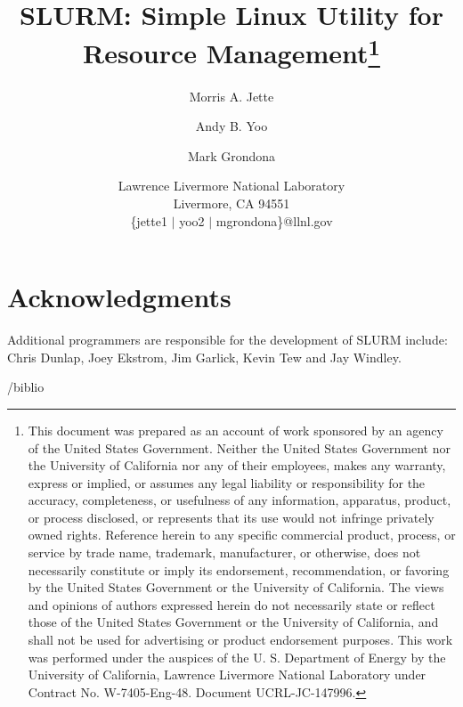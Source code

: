 \documentclass[11pt]{article}
\title{SLURM: Simple Linux Utility for Resource Management\thanks{
This document was prepared as an account of work sponsored by an
agency of the United States Government.  Neither the United States
Government nor the University of California nor any of their
employees, makes any warranty, express or implied, or assumes any
legal liability or responsibility for the accuracy, completeness, or
usefulness of any information, apparatus, product, or process
disclosed, or represents that its use would not infringe privately
owned rights. Reference herein to any specific commercial product,
process, or service by trade name, trademark, manufacturer, or
otherwise, does not necessarily constitute or imply its endorsement,
recommendation, or favoring by the United States Government or the
University of California.  The views and opinions of authors expressed
herein do not necessarily state or reflect those of the United States
Government or the University of California, and shall not be used for
advertising or product endorsement purposes.
This work was performed under the auspices of the U. S. Department of
Energy by the University of California, Lawrence Livermore National
Laboratory under Contract No. W-7405-Eng-48. Document UCRL-JC-147996.}}
\author{Morris A. Jette \and Andy B. Yoo \and Mark Grondona}
\date{Lawrence Livermore National Laboratory\\
Livermore, CA 94551\\
\{jette1 $\mid$ yoo2 $\mid$ mgrondona\}@llnl.gov}
\begin{document}
\maketitle







%



\section*{Acknowledgments}

Additional programmers are responsible for the development of 
SLURM include: Chris Dunlap, Joey Ekstrom, Jim Garlick, Kevin Tew
and Jay Windley.

\newpage


/biblio
\end{document}
